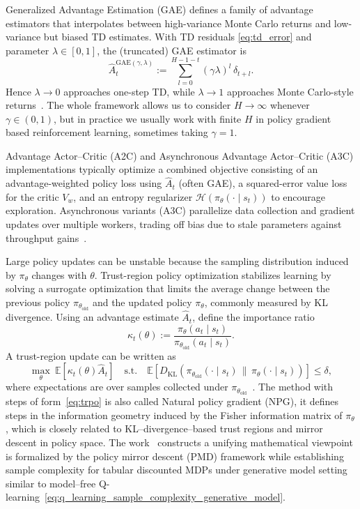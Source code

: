 \documentclass{article}
\numberwithin{equation}{section}
\newcommand{\E}{\mathbb E}
\newcommand{\cH}{\mathcal{H}}
\begin{document}
Generalized Advantage Estimation (GAE) defines a family of advantage estimators that interpolates between high-variance Monte Carlo returns and low-variance but biased TD estimates. With TD residuals \eqref{eq:td_error} and parameter $\lambda\in[0,1]$, the (truncated) GAE estimator is
\begin{equation}\label{eq:gae}
\hat A_t^{\mathrm{GAE}(\gamma,\lambda)}:=\sum_{l=0}^{H-1-t}(\gamma\lambda)^l\,\delta_{t+l}.
\end{equation}
Hence $\lambda\to 0$ approaches one-step TD, while $\lambda\to 1$ approaches Monte Carlo-style returns~\cite{arulkumaran2017drlsurvey}. The whole framework allows us to consider $H\rightarrow\infty$ whenever $\gamma\in(0, 1)$, but in practice we usually work with finite $H$ in policy gradient based reinforcement learning, sometimes taking $\gamma=1$.

Advantage Actor--Critic (A2C) and Asynchronous Advantage Actor--Critic (A3C) implementations typically optimize a combined objective consisting of an advantage-weighted policy loss using $\hat A_t$ (often GAE), a squared-error value loss for the critic $V_w$, and an entropy regularizer $\cH(\pi_\theta(\cdot\mid s_t))$ to encourage exploration. Asynchronous variants (A3C) parallelize data collection and gradient updates over multiple workers, trading off bias due to stale parameters against throughput gains~\cite{arulkumaran2017drlsurvey}.

Large policy updates can be unstable because the sampling distribution induced by $\pi_\theta$ changes with $\theta$. Trust-region policy optimization stabilizes learning by solving a surrogate optimization that limits the average change between the previous policy $\pi_{\theta_{\mathrm{old}}}$ and the updated policy $\pi_\theta$, commonly measured by KL divergence. Using an advantage estimate $\hat A_t$, define the importance ratio
\begin{equation}\label{eq:is_ratio}
\kappa_t(\theta):=\frac{\pi_\theta(a_t\mid s_t)}{\pi_{\theta_{\mathrm{old}}}(a_t\mid s_t)}.
\end{equation}
A trust-region update can be written as
\begin{equation}\label{eq:trpo}
\max_{\theta}\ \E\!\left[\kappa_t(\theta)\hat A_t\right]
\quad\text{s.t.}\quad
\E\!\left[D_{\mathrm{KL}}\!\left(\pi_{\theta_{\mathrm{old}}}(\cdot\mid s_t)\,\|\,\pi_{\theta}(\cdot\mid s_t)\right)\right]\le \delta,
\end{equation}
where expectations are over samples collected under $\pi_{\theta_{\mathrm{old}}}$~\cite{xu2024trpoentropy}. The method with steps of form~\ref{eq:trpo} is also called Natural policy gradient (NPG), it defines steps in the information geometry induced by the Fisher information matrix of $\pi_\theta$, which is closely related to KL--divergence--based trust regions and mirror descent in policy space. The work~\cite{lan2023pmd} constructs a unifying mathematical viewpoint is formalized by the policy mirror descent (PMD) framework while establishing sample complexity for tabular discounted MDPs under generative model setting similar to model--free Q-learning~\eqref{eq:q_learning_sample_complexity_generative_model}.
\end{document}
